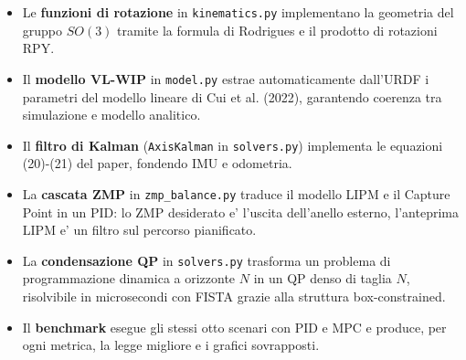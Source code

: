 \documentclass[11pt,a4paper]{report}
\begin{document}
\begin{itemize}
    \item Le \textbf{funzioni di rotazione} in \texttt{kinematics.py} implementano
          la geometria del gruppo $SO(3)$ tramite la formula di Rodrigues e il
          prodotto di rotazioni RPY.
    \item Il \textbf{modello VL-WIP} in \texttt{model.py} estrae automaticamente
          dall'URDF i parametri del modello lineare di Cui et al. (2022),
          garantendo coerenza tra simulazione e modello analitico.
    \item Il \textbf{filtro di Kalman} (\texttt{AxisKalman} in \texttt{solvers.py})
          implementa le equazioni (20)-(21) del paper, fondendo IMU e odometria.
    \item La \textbf{cascata ZMP} in \texttt{zmp\_balance.py} traduce il modello LIPM
          e il Capture Point in un PID: lo ZMP desiderato e' l'uscita dell'anello
          esterno, l'anteprima LIPM e' un filtro sul percorso pianificato.
    \item La \textbf{condensazione QP} in \texttt{solvers.py} trasforma un problema
          di programmazione dinamica a orizzonte $N$ in un QP denso di taglia $N$,
          risolvibile in microsecondi con FISTA grazie alla struttura box-constrained.
    \item Il \textbf{benchmark} esegue gli stessi otto scenari con PID e MPC e
          produce, per ogni metrica, la legge migliore e i grafici sovrapposti.
\end{itemize}
\end{document}
